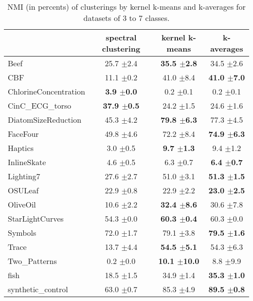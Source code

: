 \documentclass[10pt,letterpaper]{article}
\begin{document}
\begin{table}
\begin{center}
\caption{NMI (in percents) of clusterings by kernel k-means and k-averages for datasets of 3 to 7 classes.}
\label{tab:results-37}
\begin{tabular}{lccc}
 & spectral clustering & kernel k-means & k-averages \\
\hline
Beef & 25.7 $\pm$2.4 & \textbf{35.5 $\pm$2.8} & 34.5 $\pm$2.6 \\
CBF & 11.1 $\pm$0.2 & 41.0 $\pm$8.4 & \textbf{41.0 $\pm$7.0} \\
ChlorineConcentration & \textbf{3.9 $\pm$0.0} & 0.2 $\pm$0.1 & 0.2 $\pm$0.1 \\
CinC\_ECG\_torso & \textbf{37.9 $\pm$0.5} & 24.2 $\pm$1.5 & 24.6 $\pm$1.6 \\
DiatomSizeReduction & 45.3 $\pm$4.2 & \textbf{79.8 $\pm$6.3} & 77.3 $\pm$4.5 \\
FaceFour & 49.8 $\pm$4.6 & 72.2 $\pm$8.4 & \textbf{74.9 $\pm$6.3} \\
Haptics & 3.0 $\pm$0.5 & \textbf{9.7 $\pm$1.3} & 9.4 $\pm$1.2 \\
InlineSkate & 4.6 $\pm$0.5 & 6.3 $\pm$0.7 & \textbf{6.4 $\pm$0.7} \\
Lighting7 & 27.6 $\pm$2.7 & 51.0 $\pm$3.1 & \textbf{51.3 $\pm$1.5} \\
OSULeaf & 22.9 $\pm$0.8 & 22.9 $\pm$2.2 & \textbf{23.0 $\pm$2.5} \\
OliveOil & 10.6 $\pm$2.2 & \textbf{32.4 $\pm$8.6} & 30.6 $\pm$7.8 \\
StarLightCurves & 54.3 $\pm$0.0 & \textbf{60.3 $\pm$0.4} & 60.3 $\pm$0.0 \\
Symbols & 72.0 $\pm$1.7 & 79.1 $\pm$3.8 & \textbf{79.5 $\pm$1.6} \\
Trace & 13.7 $\pm$4.4 & \textbf{54.5 $\pm$5.1} & 54.3 $\pm$6.3 \\
Two\_Patterns &   0.2 $\pm$0.0 & \textbf{10.1 $\pm$10.0} &   8.8 $\pm$9.9 \\
fish & 18.5 $\pm$1.5 & 34.9 $\pm$1.4 & \textbf{35.3 $\pm$1.0} \\
synthetic\_control & 63.0 $\pm$0.7 & 85.3 $\pm$4.9 & \textbf{89.5 $\pm$0.8} \\
\end{tabular}
\end{center}
\end{table}
\end{document}

